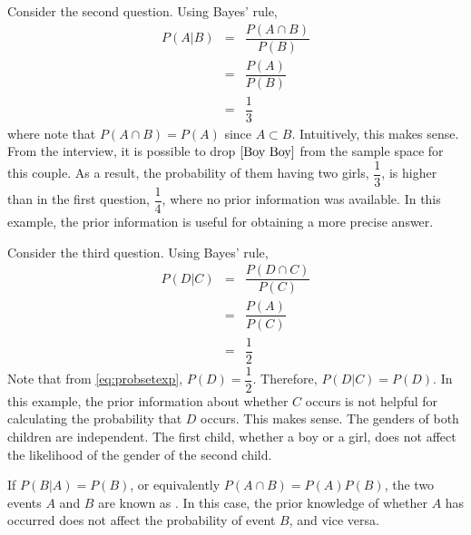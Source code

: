 Consider the second question. Using Bayes' rule,
\begin{eqnarray}
P(A|B) &=& \dfrac{P\left(A \cap B\right)}{P(B)} \nonumber \\
&=& \dfrac{P(A)}{P(B)} \nonumber \\
&=& \dfrac{1}{3} \nonumber
\end{eqnarray}
where note that $P\left(A \cap B\right) = P(A)$ since $A\subset B$. Intuitively, this makes sense. From the interview, it is possible to drop $\left[\textup{Boy Boy}\right]$ from the sample space for this couple. As a result, the probability of them having two girls, $\dfrac{1}{3}$, is higher than in the first question, $\dfrac{1}{4}$, where no prior information was available. In this example, the prior information is useful for obtaining a more precise answer.

Consider the third question. Using Bayes' rule,
\begin{eqnarray}
P(D|C) &=& \dfrac{P\left(D \cap C\right)}{P(C)} \nonumber \\
&=& \dfrac{P(A)}{P(C)} \nonumber \\
&=& \dfrac{1}{2} \nonumber
\end{eqnarray}
Note that from \eqref{eq:probsetexp}, $P(D) = \dfrac{1}{2}$. Therefore, $P(D|C) = P(D)$. In this example, the prior information about whether $C$ occurs is not helpful for calculating the probability that $D$ occurs. This makes sense. The genders of both children are independent. The first child, whether a boy or a girl, does not affect the likelihood of the gender of the second child.

If $P(B|A)=P(B)$, or equivalently $P(A\cap B) = P(A)P(B)$, the two events $A$ and $B$ are known as . In this case, the prior knowledge of whether $A$ has occurred does not affect the probability of event $B$, and vice versa.
